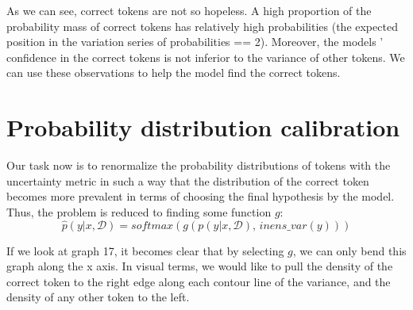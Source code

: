 \documentclass[a4paper,14pt]{extarticle}
\begin{document}
	As we can see, correct tokens are not so hopeless. A high proportion of the probability mass of correct tokens has relatively high probabilities (the expected position in the variation series of probabilities == 2). Moreover, the models ' confidence in the correct tokens is not inferior to the variance of other tokens. We can use these observations to help the model find the correct tokens.
	
	\begin{figure}[H]
	\end{figure}
	
\section{Probability distribution calibration}
	Our task now is to renormalize the probability distributions of tokens with the uncertainty metric in such a way that the distribution of the correct token becomes more prevalent in terms of choosing the final hypothesis by the model. Thus, the problem is reduced to finding some function $g$:
	\begin{equation*}
		\hat{p}(y | x, \mathcal{D}) = softmax(g(p(y | x, \mathcal{D}),\, inens\_var(y)))
	\end{equation*}
	
	If we look at graph 17, it becomes clear that by selecting $g$, we can only bend this graph along the x axis. In visual terms, we would like to pull the density of the correct token to the right edge along each contour line of the variance, and the density of any other token to the left.
	
\end{document}
